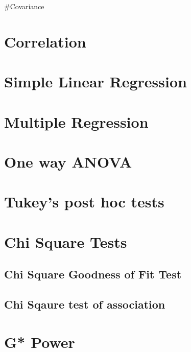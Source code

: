 \documentclass[
]{book}
\begin{document}
\#Covariance

\hypertarget{correlation}{%
\chapter{Correlation}\label{correlation}}

\hypertarget{simple-linear-regression}{%
\chapter{Simple Linear Regression}\label{simple-linear-regression}}

\hypertarget{multiple-regression}{%
\chapter{Multiple Regression}\label{multiple-regression}}

\hypertarget{one-way-anova}{%
\chapter{One way ANOVA}\label{one-way-anova}}

\hypertarget{tukeys-post-hoc-tests}{%
\chapter{Tukey's post hoc tests}\label{tukeys-post-hoc-tests}}

\hypertarget{chi-square-tests}{%
\chapter{Chi Square Tests}\label{chi-square-tests}}

\hypertarget{chi-square-goodness-of-fit-test}{%
\section{Chi Square Goodness of Fit Test}\label{chi-square-goodness-of-fit-test}}

\hypertarget{chi-sqaure-test-of-association}{%
\section{Chi Sqaure test of association}\label{chi-sqaure-test-of-association}}

\hypertarget{g-power}{%
\chapter{G* Power}\label{g-power}}

  
\end{document}

